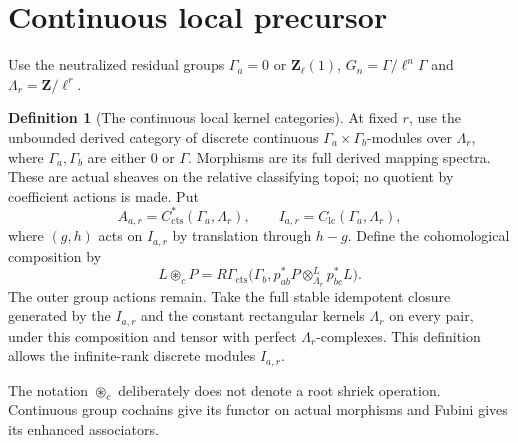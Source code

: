 \documentclass[11pt]{article}
\theoremstyle{definition}
\newtheorem{definition}[proposition]{Definition}
\theoremstyle{remark}
\begin{document}
\section{Continuous local precursor}
Use the neutralized residual groups $\Gamma_a=0$ or $\mathbf Z_\ell(1)$,
$G_n=\Gamma/\ell^n\Gamma$ and $\Lambda_r=\mathbf Z/\ell^r$.
\begin{definition}[The continuous local kernel categories]
\label{def:continuous-local-root}
At fixed $r$, use the unbounded derived category of discrete
continuous $\Gamma_a\times\Gamma_b$-modules over $\Lambda_r$, where
$\Gamma_a,\Gamma_b$ are either $0$ or $\Gamma$.  Morphisms are its
full derived mapping spectra.  These are actual sheaves on the
relative classifying topoi; no quotient by coefficient actions is
made.  Put
\[
 A_{a,r}=C^*_{\mathrm{cts}}(\Gamma_a,\Lambda_r),\qquad
 I_{a,r}=C_{\mathrm{lc}}(\Gamma_a,\Lambda_r),
\]
where $(g,h)$ acts on $I_{a,r}$ by translation through $h-g$.
Define the cohomological composition by
\[
 L\mathbin{\circledast_c}P
  =R\Gamma_{\mathrm{cts}}\bigl(\Gamma_b,
       p_{ab}^*P\otimes_{\Lambda_r}^L p_{bc}^*L\bigr).
\]
The outer group actions remain.  Take the full stable idempotent
closure generated by the $I_{a,r}$ and the constant rectangular
kernels $\Lambda_r$ on every pair, under this composition and tensor
with perfect $\Lambda_r$-complexes.  This definition allows the
infinite-rank discrete modules $I_{a,r}$.
\end{definition}
The notation $\circledast_c$ deliberately does not denote a root
shriek operation.  Continuous group cochains give its functor on
actual morphisms and Fubini gives its enhanced associators.
\end{document}
